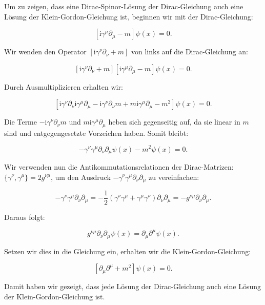 Um zu zeigen, dass eine Dirac-Spinor-Lösung der Dirac-Gleichung auch eine Lösung der Klein-Gordon-Gleichung ist, beginnen wir mit der Dirac-Gleichung:

\[
\left[\mathrm{i} \gamma^\mu \partial_\mu - m\right] \psi(x) = 0.
\]

Wir wenden den Operator \(\left[\mathrm{i} \gamma^\nu \partial_\nu + m\right]\) von links auf die Dirac-Gleichung an:

\[
\left[\mathrm{i} \gamma^\nu \partial_\nu + m\right] \left[\mathrm{i} \gamma^\mu \partial_\mu - m\right] \psi(x) = 0.
\]

Durch Ausmultiplizieren erhalten wir:

\[
\left[\mathrm{i} \gamma^\nu \partial_\nu \mathrm{i} \gamma^\mu \partial_\mu - \mathrm{i} \gamma^\nu \partial_\nu m + m \mathrm{i} \gamma^\mu \partial_\mu - m^2\right] \psi(x) = 0.
\]

Die Terme \(- \mathrm{i} \gamma^\nu \partial_\nu m\) und \(m \mathrm{i} \gamma^\mu \partial_\mu\) heben sich gegenseitig auf, da sie linear in \(m\) sind und entgegengesetzte Vorzeichen haben. Somit bleibt:

\[
-\gamma^\nu \gamma^\mu \partial_\nu \partial_\mu \psi(x) - m^2 \psi(x) = 0.
\]

Wir verwenden nun die Antikommutationsrelationen der Dirac-Matrizen: \(\{\gamma^\nu, \gamma^\mu\} = 2g^{\nu\mu}\), um den Ausdruck \(-\gamma^\nu \gamma^\mu \partial_\nu \partial_\mu\) zu vereinfachen:

\[
-\gamma^\nu \gamma^\mu \partial_\nu \partial_\mu = -\frac{1}{2} \left(\gamma^\nu \gamma^\mu + \gamma^\mu \gamma^\nu\right) \partial_\nu \partial_\mu = -g^{\nu\mu} \partial_\nu \partial_\mu.
\]

Daraus folgt:

\[
g^{\nu\mu} \partial_\nu \partial_\mu \psi(x) = \partial_\mu \partial^\mu \psi(x).
\]

Setzen wir dies in die Gleichung ein, erhalten wir die Klein-Gordon-Gleichung:

\[
\left[\partial_\mu \partial^\mu + m^2\right] \psi(x) = 0.
\]

Damit haben wir gezeigt, dass jede Lösung der Dirac-Gleichung auch eine Lösung der Klein-Gordon-Gleichung ist.